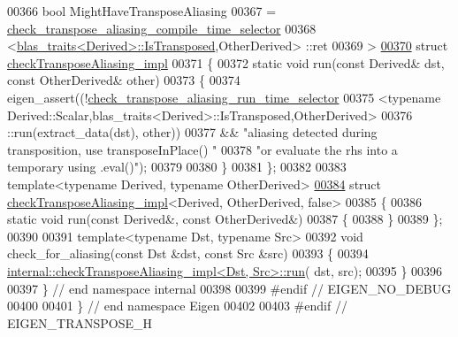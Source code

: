 \begin{DoxyCode}
00366          \textcolor{keywordtype}{bool} MightHaveTransposeAliasing
00367                  = \hyperlink{struct_eigen_1_1internal_1_1check__transpose__aliasing__compile__time__selector}{check\_transpose\_aliasing\_compile\_time\_selector}
00368                      <\hyperlink{struct_eigen_1_1internal_1_1blas__traits}{blas\_traits<Derived>::IsTransposed},OtherDerived>
      ::ret
00369         >
\hyperlink{struct_eigen_1_1internal_1_1check_transpose_aliasing__impl}{00370} \textcolor{keyword}{struct }\hyperlink{struct_eigen_1_1internal_1_1check_transpose_aliasing__impl}{checkTransposeAliasing\_impl}
00371 \{
00372     \textcolor{keyword}{static} \textcolor{keywordtype}{void} run(\textcolor{keyword}{const} Derived& dst, \textcolor{keyword}{const} OtherDerived& other)
00373     \{
00374         eigen\_assert((!\hyperlink{struct_eigen_1_1internal_1_1check__transpose__aliasing__run__time__selector}{check\_transpose\_aliasing\_run\_time\_selector}
00375                       <\textcolor{keyword}{typename} Derived::Scalar,blas\_traits<Derived>::IsTransposed,OtherDerived>
00376                       ::run(extract\_data(dst), other))
00377           && \textcolor{stringliteral}{"aliasing detected during transposition, use transposeInPlace() "}
00378              \textcolor{stringliteral}{"or evaluate the rhs into a temporary using .eval()"});
00379 
00380     \}
00381 \};
00382 
00383 \textcolor{keyword}{template}<\textcolor{keyword}{typename} Derived, \textcolor{keyword}{typename} OtherDerived>
\hyperlink{struct_eigen_1_1internal_1_1check_transpose_aliasing__impl_3_01_derived_00_01_other_derived_00_01false_01_4}{00384} \textcolor{keyword}{struct }\hyperlink{struct_eigen_1_1internal_1_1check_transpose_aliasing__impl}{checkTransposeAliasing\_impl}<Derived, OtherDerived, false>
00385 \{
00386     \textcolor{keyword}{static} \textcolor{keywordtype}{void} run(\textcolor{keyword}{const} Derived&, \textcolor{keyword}{const} OtherDerived&)
00387     \{
00388     \}
00389 \};
00390 
00391 \textcolor{keyword}{template}<\textcolor{keyword}{typename} Dst, \textcolor{keyword}{typename} Src>
00392 \textcolor{keywordtype}{void} check\_for\_aliasing(\textcolor{keyword}{const} Dst &dst, \textcolor{keyword}{const} Src &src)
00393 \{
00394   \hyperlink{struct_eigen_1_1internal_1_1check_transpose_aliasing__impl}{internal::checkTransposeAliasing\_impl<Dst, Src>::run}(
      dst, src);
00395 \}
00396 
00397 \} \textcolor{comment}{// end namespace internal}
00398 
00399 \textcolor{preprocessor}{#endif // EIGEN\_NO\_DEBUG}
00400 
00401 \} \textcolor{comment}{// end namespace Eigen}
00402 
00403 \textcolor{preprocessor}{#endif // EIGEN\_TRANSPOSE\_H}
\end{DoxyCode}
